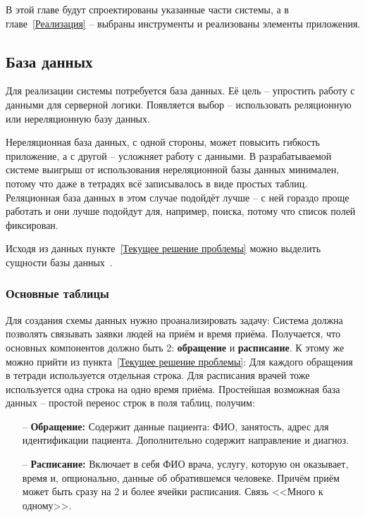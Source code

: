 \documentclass[a4paper,article]{article}
\begin{document}
\begin{sloppypar}
    В этой главе будут спроектированы указанные части системы, а в главе~\ref{Реализация} -- выбраны инструменты и реализованы элементы приложения.

    \subsection{База данных}

    Для реализации системы потребуется база данных. Её цель -- упростить работу с данными для серверной логики. Появляется выбор -- использовать реляционную или нереляционную базу данных.

    Нереляционная база данных, с одной стороны, может повысить гибкость приложение, а с другой -- усложняет работу с данными. В разрабатываемой системе выигрыш от использования нереляционной базы данных минимален, потому что даже в тетрадях всё записывалось в виде простых таблиц. Реляционная база данных в этом случае подойдёт лучше -- с ней гораздо проще работать и они лучше подойдут для, например, поиска, потому что список полей фиксирован.

    Исходя из данных пункте~\ref{Текущее решение проблемы} можно выделить сущности базы данных~\cite{dbdesign}.

    \subsubsection{Основные таблицы}\label{Проектирование БД. Основные компоненты}

    Для создания схемы данных нужно проанализировать задачу: Система должна позволять связывать заявки людей на приём и время приёма. Получается, что основных компонентов должно быть 2: \textbf{обращение} и \textbf{расписание}. К этому же можно прийти из пункта~\ref{Текущее решение проблемы}: Для каждого обращения в тетради используется отдельная строка. Для расписания врачей тоже используется одна строка на одно время приёма. Простейшая возможная база данных -- простой перенос строк в поля таблиц, получим:

    \begin{itemize}[nolistsep]
        \item[--] \textbf{Обращение:} Содержит данные пациента: ФИО, занятость, адрес для идентификации пациента. Дополнительно содержит направление и диагноз.
        \item[--] \textbf{Расписание:} Включает в себя ФИО врача, услугу, которую он оказывает, время и, опционально, данные об обратившемся человеке. Причём приём может быть сразу на 2 и более ячейки расписания. Связь <<Много к одному>>.
    \end{itemize}


\end{sloppypar}
\end{document}
